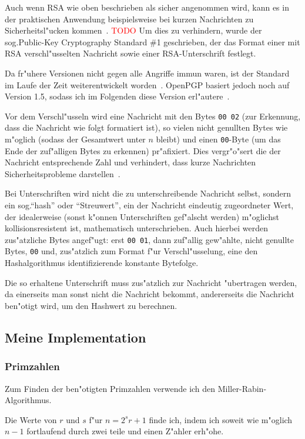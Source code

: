\documentclass[12pt]{article}
\newcommand{\todo}[1]{\textcolor{red}{\mbox{TODO}}\marginpar{\textcolor{red}{#1}}}
\begin{document}
Auch wenn RSA wie oben beschrieben als sicher angenommen wird, kann es in der praktischen
Anwendung beispielsweise bei kurzen Nachrichten zu Sicherheitsl"ucken kommen~\cite{sinews}. \todo{Auch komplett zitieren?}
Um dies zu verhindern, wurde der sog.\@ Public-Key Cryptography Standard \#1 geschrieben,
der das Format einer mit RSA verschl"usselten Nachricht sowie einer RSA-Unterschrift festlegt.

Da fr"uhere Versionen nicht gegen alle Angriffe immun waren, ist der Standard
im Laufe der Zeit weiterentwickelt worden~\cite{sinews}.
OpenPGP basiert jedoch noch auf Version 1.5, sodass ich im Folgenden diese Version erl"autere~\cite{rfc4480}.

Vor dem Verschl"usseln wird eine Nachricht mit den Bytes \verb|00 02|
(zur Erkennung, dass die Nachricht wie folgt formatiert ist),
so vielen nicht genullten Bytes wie m"oglich (sodass der Gesamtwert unter $n$ bleibt)
und einen \verb|00|-Byte (um das Ende der zuf"alligen Bytes zu erkennen) pr"afixiert.
Dies vergr"o"sert die der Nachricht entsprechende Zahl und verhindert,
dass kurze Nachrichten Sicherheitsprobleme darstellen~\cite{rfc4480,sinews}.

Bei Unterschriften wird nicht die zu unterschreibende Nachricht selbst,
sondern ein sog.\@ "`hash"' oder "`Streuwert"', ein der Nachricht eindeutig zugeordneter Wert,
der idealerweise (sonst k"onnen Unterschriften gef"alscht werden) m"oglichst kol\-li\-si\-ons\-re\-sis\-tent ist,
mathematisch unterschrieben.
Auch hierbei werden zus"atzliche Bytes angef"ugt: erst \verb|00 01|, dann zuf"allig gew"ahlte, nicht genullte Bytes,
\verb|00| und, zus"atzlich zum Format f"ur Verschl"usselung, eine den Hashalgorithmus identifizierende konstante Bytefolge.

Die so erhaltene Unterschrift muss zus"atzlich zur Nachricht "ubertragen werden,
da einerseits man sonst nicht die Nachricht bekommt, andererseits die Nachricht
ben"otigt wird, um den Hashwert zu berechnen.

\subsection{Meine Implementation}
\subsubsection{Primzahlen}
Zum Finden der ben"otigten Primzahlen verwende ich den Miller-Rabin-Algorithmus.

Die Werte von $r$ und $s$ f"ur $n = 2^s r + 1$ finde ich, indem ich soweit wie m"oglich
$n - 1$ fortlaufend durch zwei teile und einen Z"ahler erh"ohe.
\end{document}
